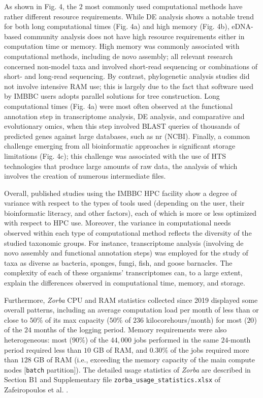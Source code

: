    As shown in Fig. 4, the $2$ most commonly used computational methods have rather different resource requirements. 
   While DE analysis shows a notable trend for both long computational times (Fig. 4a) and high memory (Fig. 4b), eDNA-based community analysis does not have high resource requirements either in computation time or memory. 
   High memory was commonly associated with computational methods, including de novo assembly; 
   all relevant research concerned non-model taxa and involved short-read sequencing or combinations of short- and long-read sequencing. 
   By contrast, phylogenetic analysis studies did not involve intensive RAM use; 
   this is largely due to the fact that software used by IMBBC users adopts parallel solutions for tree construction. 
   Long computational times (Fig. 4a) were most often observed at the functional annotation step in transcriptome analysis, DE analysis, and comparative and evolutionary omics, when this step involved BLAST queries of thousands of predicted genes against large databases, such as nr (NCBI). 
   Finally, a common challenge emerging from all bioinformatic approaches is significant storage limitations (Fig. 4c); 
   this challenge was associated with the use of HTS technologies that produce large amounts of raw data, the analysis of which involves the creation of numerous intermediate files.

   Overall, published studies using the IMBBC HPC facility show a degree of variance with respect to the types of tools used 
   (depending on the user, their bioinformatic literacy, and other factors), 
   each of which is more or less optimized with respect to HPC use. 
   Moreover, the variance in computational needs observed within each type of computational method reflects the diversity of the studied taxonomic groups. 
   For instance, transcriptome analysis (involving de novo assembly and functional annotation steps) was employed for the study of taxa as diverse as bacteria, sponges, fungi, fish, and goose barnacles. 
   The complexity of each of these organisms' transcriptomes can, to a large extent, explain the differences observed in computational time, memory, and storage.
   
   Furthermore, \textit{Zorba} CPU and RAM statistics collected since 2019 displayed some overall patterns, including an average computation load per month of less than or close to $50\%$ of its max capacity ($50\%$ of $236$ kilocorehours/month) for most ($20$) of the $24$ months of the logging period. 
   Memory requirements were also heterogeneous: 
   most ($90\%$) of the $44,000$ jobs performed in the same $24$-month period required less than $10$ GB of RAM, and $0.30\%$ of the jobs required more than $128$ GB of RAM 
   (i.e., exceeding the memory capacity of the main compute nodes [\texttt{batch} partition]). 
   The detailed usage statistics of \textit{Zorba} are described in Section B1 and Supplementary file \texttt{zorba\_usage\_statistics.xlsx} of Zafeiropoulos et al. \citep{haris_zafeiropoulos_2021_4665308}.
   
